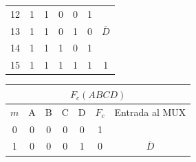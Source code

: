 \begin{center}
\begin{minipage}[t]{0.45\textwidth}
\begin{tabular}{ccccccc}
\multicolumn{1}{c|}{12}                          & 1                         & 1                         & 0                         & \multicolumn{1}{c|}{0}                         & \multicolumn{1}{c|}{1}                             &                                  \\
\multicolumn{1}{c|}{13}                          & 1                         & 1                         & 0                         & \multicolumn{1}{c|}{1}                         & \multicolumn{1}{c|}{0}                             & \multirow{-2}{*}{$\overline{D}$} \\ \hline
\multicolumn{1}{c|}{14}                          & 1                         & 1                         & 1                         & \multicolumn{1}{c|}{0}                         & \multicolumn{1}{c|}{1}                             &                                  \\
\multicolumn{1}{c|}{15}                          & 1                         & 1                         & 1                         & \multicolumn{1}{c|}{1}                         & \multicolumn{1}{c|}{1}                             & \multirow{-2}{*}{1}             
\end{tabular}
    \end{minipage}
    \begin{tabular}{ccccccc}
\multicolumn{7}{c}{\cellcolor[HTML]{FFFFC7}$F_c(ABCD)$}                                                                                                                                                                                                                       \\ \hline
\multicolumn{1}{c|}{\cellcolor[HTML]{9AFF99}$m$} & \cellcolor[HTML]{ECF4FF}A & \cellcolor[HTML]{ECF4FF}B & \cellcolor[HTML]{ECF4FF}C & \multicolumn{1}{c|}{\cellcolor[HTML]{ECF4FF}D} & \multicolumn{1}{c|}{\cellcolor[HTML]{FFCCC9}$F_c$} & Entrada al MUX                   \\ \hline
\multicolumn{1}{c|}{0}                           & 0                         & 0                         & 0                         & \multicolumn{1}{c|}{0}                         & \multicolumn{1}{c|}{1}                             &                                  \\
\multicolumn{1}{c|}{1}                           & 0                         & 0                         & 0                         & \multicolumn{1}{c|}{1}                         & \multicolumn{1}{c|}{0}                             & \multirow{-2}{*}{$\overline{D}$} \\ \hline

\end{tabular}
\end{center}
